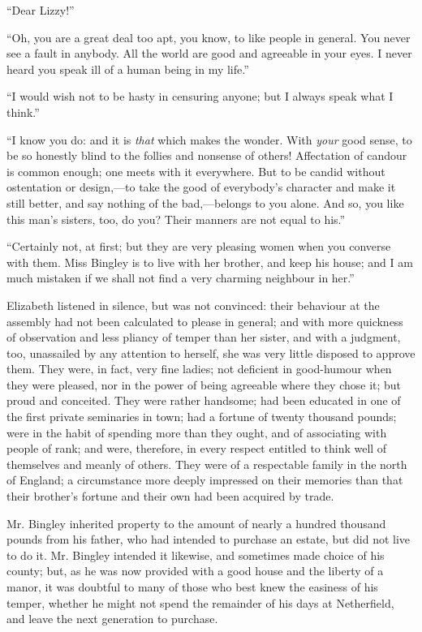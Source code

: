 \documentclass[12pt]{book}
\begin{document}
``Dear Lizzy!''

``Oh, you are a great deal too apt, you know, to like people in general. You never see a fault in anybody. All the world are good and agreeable in your eyes. I never heard you speak ill of a human being in my life.''

``I would wish not to be hasty in censuring anyone; but I always speak what I think.''

``I know you do: and it is \textit{that} which makes the wonder. With \textit{your} good sense, to be so honestly blind to the follies and nonsense of others! Affectation of candour is common enough; one meets with it everywhere. But to be candid without ostentation or design,---to take the good of everybody's character and make it still better, and say nothing of the bad,---belongs to you alone. And so, you like this man's sisters, too, do you? Their manners are not equal to his.''

``Certainly not, at first; but they are very pleasing women when you converse with them. Miss Bingley is to live with her brother, and keep his house; and I am much mistaken if we shall not find a very charming neighbour in her.''

Elizabeth listened in silence, but was not convinced: their behaviour at the assembly had not been calculated to please in general; and with more quickness of observation and less pliancy of temper than her sister, and with a judgment, too, unassailed by any attention to herself, she was very little disposed to approve them. They were, in fact, very fine ladies; not deficient in good-humour when they were pleased, nor in the power of being agreeable where they chose it; but proud and conceited. They were rather handsome; had been educated in one of the first private seminaries in town; had a fortune of twenty thousand pounds; were in the habit of spending more than they ought, and of associating with people of rank; and were, therefore, in every respect entitled to think well of themselves and meanly of others. They were of a respectable family in the north of England; a circumstance more deeply impressed on their memories than that their brother's fortune and their own had been acquired by trade.

Mr. Bingley inherited property to the amount of nearly a hundred thousand pounds from his father, who had intended to purchase an estate, but did not live to do it. Mr. Bingley intended it likewise, and sometimes made choice of his county; but, as he was now provided with a good house and the liberty of a manor, it was doubtful to many of those who best knew the easiness of his temper, whether he might not spend the remainder of his days at Netherfield, and leave the next generation to purchase.
\end{document}
